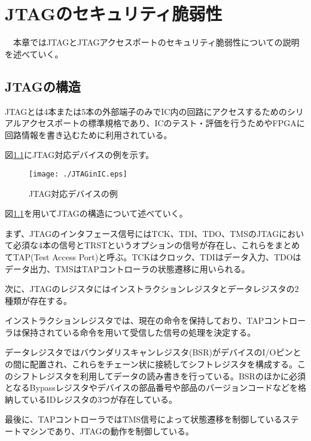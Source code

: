 \documentclass{thesis}
\begin{document}
\chapter{JTAGのセキュリティ脆弱性}
　本章ではJTAGとJTAGアクセスポートのセキュリティ脆弱性についての説明を述べていく。
\section{JTAGの構造}
JTAGとは4本または5本の外部端子のみでIC内の回路にアクセスするためのシリアルアクセスポートの標準規格であり、ICのテスト・評価を行うためやFPGAに回路情報を書き込むために利用されている。\cite{JTAGセキュリティ}\par
図\ref{JTAG}にJTAG対応デバイスの例を示す。
\begin{figure}[H]
 \center
 \texttt{[image: ./JTAGinIC.eps]}
 \caption{JTAG対応デバイスの例}
 \label{JTAG}
\end{figure}
図\ref{JTAG}を用いてJTAGの構造について述べていく。\par
まず、JTAGのインタフェース信号にはTCK、TDI、TDO、TMSのJTAGにおいて必須な4本の信号とTRSTというオプションの信号が存在し、これらをまとめてTAP(Test Access Port)と呼ぶ。TCKはクロック、TDIはデータ入力、TDOはデータ出力、TMSはTAPコントローラの状態遷移に用いられる。\par
次に、JTAGのレジスタにはインストラクションレジスタとデータレジスタの2種類が存在する。\par
インストラクションレジスタでは、現在の命令を保持しており、TAPコントローラは保持されている命令を用いて受信した信号の処理を決定する。\par
データレジスタではバウンダリスキャンレジスタ(BSR)がデバイスのI/Oピンとの間に配置され、これらをチェーン状に接続してシフトレジスタを構成する。このシフトレジスタを利用してデータの読み書きを行っている。BSRのほかに必須となるBypassレジスタやデバイスの部品番号や部品のバージョンコードなどを格納しているIDレジスタの3つが存在している。\par
最後に、TAPコントローラではTMS信号によって状態遷移を制御しているステートマシンであり、JTAGの動作を制御している。\cite{JTAG構造}
\end{document}
